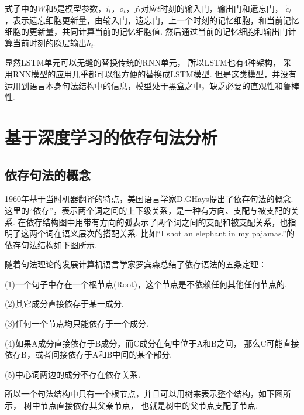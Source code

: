 \documentclass[bachelor,adobefonts]{jnuthesis}
\begin{document}
式子中的$W$和$b$是模型参数，$i_{t}$，$o_{t}$，$f_{t}$对应$t$时刻的输入门，输出门和遗忘门，
$\widetilde{c}_{t}$，表示遗忘细胞更新量，由输入门，遗忘门，上一个时刻的记忆细胞，和当前记忆细胞的更新量，共同计算当前的记忆细胞值.
然后通过当前的记忆细胞和输出门计算当前时刻的隐层输出$h_{t}$.

显然LSTM单元可以无缝的替换传统的RNN单元，
所以LSTM也有4种架构，
采用RNN模型的应用几乎都可以很方便的替换成LSTM模型.
但是这类模型，并没有运用到语言本身句法结构中的信息，模型处于黑盒之中，缺乏必要的直观性和鲁棒性.

\section{基于深度学习的依存句法分析}
\subsection{依存句法的概念}
1960年基于当时机器翻译的特点，美国语言学家D.GHays提出了依存句法的概念\cite{Hays1960Grouping}.
这里的“依存”，表示两个词之间的上下级关系，是一种有方向、支配与被支配的关系.
在依存结构图中用带有方向的弧表示了两个词之间的支配和被支配关系，也指明了这两个词在语义层次的搭配关系.
比如“I shot an elephant in my pajamas.”的依存句法结构如下图所示.


随着句法理论的发展计算机语言学家罗宾森总结了依存语法的五条定理：

(1)一个句子中存在一个根节点(Root)，这个节点是不依赖任何其他任何节点的.

(2)其它成分直接依存于某一成分.

(3)任何一个节点均只能依存于一个成分.

(4)如果A成分直接依存于B成分，而C成分在句中位于A和B之间，
那么C可能直接依存B，或者间接依存于A和B中间的某个部分.

(5)中心词两边的成分不存在依存关系.

所以一个句法结构中只有一个根节点，并且可以用树来表示整个结构，如下图所示，
树中节点直接依存其父亲节点，
也就是树中的父节点支配子节点.

\end{document}
